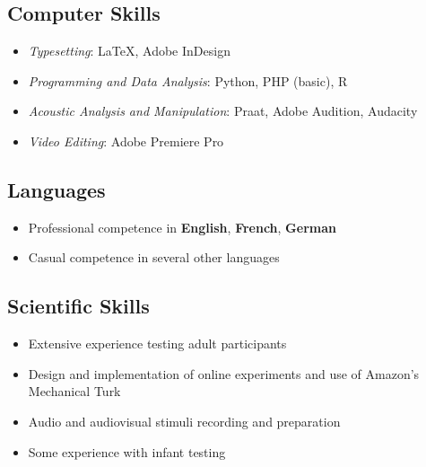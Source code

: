 \documentclass[a4paper, 10pt]{article}
\begin{document}

\subsection*{Computer Skills}

\begin{itemize}
\item \textit{Typesetting}: {\LaTeX{}, Adobe InDesign}
\item \textit{Programming and Data Analysis}: {Python, PHP (basic), R}
\item \textit{Acoustic Analysis and Manipulation}: {Praat, Adobe Audition, Audacity}
\item \textit{Video Editing}: {Adobe Premiere Pro}
\end{itemize}


\subsection*{Languages}

\begin{itemize}
\item Professional competence in \textbf{English}, \textbf{French},
  \textbf{German}
\item Casual competence in several other languages
\end{itemize}

\fi



\iffalse


\subsection*{Scientific Skills}

\begin{itemize}
\item Extensive experience testing adult participants
\item Design and implementation of online experiments and use of
  Amazon's Mechanical Turk
\item Audio and audiovisual stimuli recording and preparation
\item Some experience with infant testing

\end{itemize}
\end{document}
